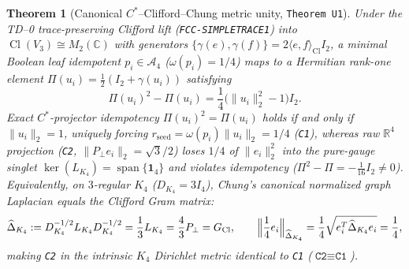 \documentclass[11pt,a4paper]{article}
\newtheorem{theorem}[definition]{Theorem}
\theoremstyle{remark}
\begin{document}
\begin{theorem}[Canonical $C^*$--Clifford--Chung metric unity, \texttt{Theorem U1}]
\label{thm:upstream-u1}
Under the TD--0 trace-preserving Clifford lift (\texttt{FCC-SIMPLETRACE1}) into
$\operatorname{Cl}(V_3)\cong M_2(\mathbb{C})$ with generators
$\{\gamma(e),\gamma(f)\}=2\langle e,f\rangle_{\mathrm{Cl}}I_2$, a minimal
Boolean leaf idempotent $p_i\in\mathcal{A}_4$ ($\omega(p_i)=1/4$) maps to a
Hermitian rank-one element $\Pi(u_i)=\frac{1}{2}(I_2+\gamma(u_i))$ satisfying
\begin{equation}
 \Pi(u_i)^2-\Pi(u_i)=\frac{1}{4}\bigl(\|u_i\|_2^2-1\bigr)I_2.
 \label{eq:td0-u1-idempotency}
\end{equation}
Exact $C^*$-projector idempotency $\Pi(u_i)^2=\Pi(u_i)$ holds if and only if
$\|u_i\|_2=1$, uniquely forcing $r_{\mathrm{seed}}=\omega(p_i)\|u_i\|_2=1/4$
(\texttt{C1}), whereas raw $\mathbb{R}^4$ projection (\texttt{C2},
$\|P_\perp e_i\|_2=\sqrt{3}/2$) loses $1/4$ of $\|e_i\|_2^2$ into the pure-gauge
singlet $\ker(L_{K_4})=\operatorname{span}\{\mathbf{1}_4\}$ and violates
idempotency ($\Pi^2-\Pi=-\frac{1}{16}I_2\neq 0$). Equivalently, on $3$-regular
$K_4$ ($D_{K_4}=3I_4$), Chung's canonical normalized graph Laplacian equals the
Clifford Gram matrix:
\begin{equation}
 \widehat{\Delta}_{K_4}:=D_{K_4}^{-1/2}L_{K_4}D_{K_4}^{-1/2}
 =\frac{1}{3}L_{K_4}=\frac{4}{3}P_\perp=G_{\mathrm{Cl}},
 \qquad
 \Bigl\|\frac{1}{4}e_i\Bigr\|_{\widehat{\Delta}_{K_4}}
 =\frac{1}{4}\sqrt{e_i^T\widehat{\Delta}_{K_4}e_i}=\frac{1}{4},
 \label{eq:td0-u1-chung}
\end{equation}
making \texttt{C2} in the intrinsic $K_4$ Dirichlet metric identical to
\texttt{C1} ($\texttt{C2}\equiv\texttt{C1}$).
\end{theorem}
\end{document}
